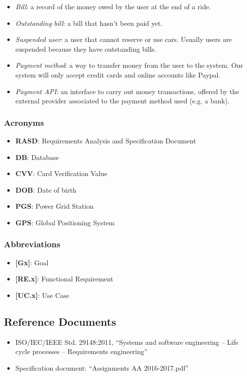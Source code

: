\documentclass[english]{article}
\begin{document}
\begin{itemize}
\item{\textit{Bill}: a record of the money owed by the user at the end of a ride.}
\item{\textit{Outstanding bill}: a bill that hasn’t been paid yet. }
\item{\textit{Suspended user}: a user that cannot reserve or use cars. Usually users are suspended because they have outstanding bills.}
\item{\textit{Payment method}: a way to transfer money from the user to the system. Our system will only accept credit cards and online accounts like Paypal.}
\item{\textit{Payment API}: an interface to carry out money transactions, offered by the external provider associated to the payment method used (e.g. a bank).}
\end{itemize}

\subsubsection{Acronyms}
\begin{itemize}
\item{\textbf{RASD}: Requirements Analysis and Specification Document}
\item{\textbf{DB}: Database}
\item{\textbf{CVV}: Card Verification Value}
\item{\textbf{DOB}: Date of birth}
\item{\textbf{PGS}: Power Grid Station}
\item{\textbf{GPS}: Global Positioning System}
\end{itemize}

\subsubsection{Abbreviations}
\begin{itemize}
\item{\textbf{[Gx]}: Goal}
\item{\textbf{[RE.x]}: Functional Requirement}
\item{\textbf{[UC.x]}: Use Case}
\end{itemize}

\subsection{Reference Documents}

\begin{itemize}
	\item{ISO/IEC/IEEE Std. 29148:2011, “Systems and software engineering -- Life cycle processes -- Requirements engineering”}
	\item{Specification document: “Assignments AA 2016-2017.pdf”}
\end{itemize}
\end{document}
